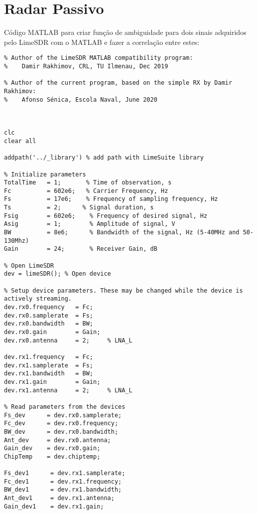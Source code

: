 
\chapter{Radar Passivo} %

\label{AppendixB} %


Código MATLAB para criar função de ambiguidade para dois sinais adquiridos pelo LimeSDR com o MATLAB e fazer a correlação entre estes:

\begin{verbatim}
% Author of the LimeSDR MATLAB compatibility program:
%    Damir Rakhimov, CRL, TU Ilmenau, Dec 2019

% Author of the current program, based on the simple RX by Damir Rakhimov:
%    Afonso Sénica, Escola Naval, June 2020



clc
clear all

addpath('../_library') % add path with LimeSuite library

% Initialize parameters
TotalTime   = 1;       % Time of observation, s
Fc          = 602e6;   % Carrier Frequency, Hz
Fs          = 17e6;    % Frequency of sampling frequency, Hz
Ts          = 2;      % Signal duration, s
Fsig        = 602e6;    % Frequency of desired signal, Hz
Asig        = 1;        % Amplitude of signal, V
BW          = 8e6;      % Bandwidth of the signal, Hz (5-40MHz and 50-130Mhz)
Gain        = 24;       % Receiver Gain, dB

% Open LimeSDR
dev = limeSDR(); % Open device

% Setup device parameters. These may be changed while the device is actively streaming.
dev.rx0.frequency   = Fc;
dev.rx0.samplerate  = Fs;
dev.rx0.bandwidth   = BW;
dev.rx0.gain        = Gain;
dev.rx0.antenna     = 2;     % LNA_L

dev.rx1.frequency   = Fc;
dev.rx1.samplerate  = Fs;
dev.rx1.bandwidth   = BW;
dev.rx1.gain        = Gain;
dev.rx1.antenna     = 2;     % LNA_L

% Read parameters from the devices
Fs_dev      = dev.rx0.samplerate; 
Fc_dev      = dev.rx0.frequency;
BW_dev      = dev.rx0.bandwidth;
Ant_dev     = dev.rx0.antenna;
Gain_dev    = dev.rx0.gain;
ChipTemp    = dev.chiptemp;

Fs_dev1      = dev.rx1.samplerate;  
Fc_dev1      = dev.rx1.frequency;
BW_dev1      = dev.rx1.bandwidth;
Ant_dev1     = dev.rx1.antenna;
Gain_dev1    = dev.rx1.gain;



\end{verbatim}
